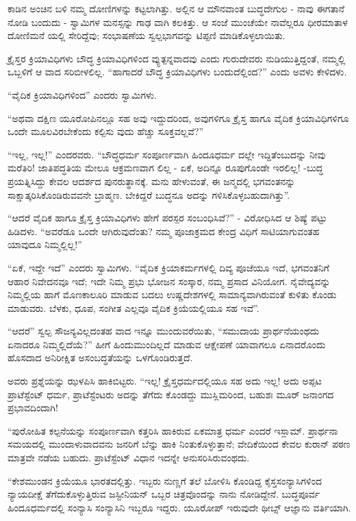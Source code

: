 ಕಾಡಿನ ಅಂಚಿನ ಬಳಿ ನಮ್ಮ ದೋಣಿಗಳನ್ನು ಕಟ್ಟಲಾಗಿತ್ತು. ಅಲ್ಲಿನ ಆ ಮೌನವಾಂತ ಬುದ್ಧದೇಗುಲ - ನಾವು ಈಗತಾನೆ ನೋಡಿ ಬಂದುದು - ಸ್ವಾಮಿಗಳ ಮನಸ್ಸನ್ನು ಗಾಢ ವಾಗಿ ಕಲಕಿತ್ತು. ಆ ಸಂಜೆ ಮುಂಚೆಯೇ ನಾವೆಲ್ಲರೂ ಧೀರಮಾತಾಳ ದೋಣಿಮನೆ ಯಲ್ಲಿ ಸೇರಿದ್ದೆವು; ಸಂಭಾಷಣೆಯ ಸ್ವಲ್ಪಭಾಗವನ್ನು ಟಿಪ್ಪಣಿ ಮಾಡಿಕೊಳ್ಳಲಾಯಿತು.

ಕ್ರೈಸ್ತರ ಕ್ರಿಯಾವಿಧಿಗಳು ಬೌದ್ಧ ಕ್ರಿಯಾವಿಧಿಗಳಿಂದ ವ್ಯುತ್ಪನ್ನವಾದವು ಎಂದು ಗುರುದೇವರು ನುಡಿಯುತ್ತಿದ್ದಂತೆ, ನಮ್ಮಲ್ಲಿ ಒಬ್ಬಳಿಗೆ ಆ ವಾದ ಸರಿಬೀಳಲಿಲ್ಲ. “ಹಾಗಾದರೆ ಬೌದ್ಧ ಕ್ರಿಯಾವಿಧಿಗಳು ಬಂದುದೆಲ್ಲಿಂದ?” ಎಂದು ಅವಳು ಕೇಳಿದಳು.

“ವೈದಿಕ ಕ್ರಿಯಾವಿಧಿಗಳಿಂದ” ಎಂದರು ಸ್ವಾಮಿಗಳು.

“ಅಥವಾ ದಕ್ಷಿಣ ಯೂರೋಪಿನಲ್ಲೂ ಸಹ ಅವು ಇದ್ದುದರಿಂದ, ಅವುಗಳಿಗೂ ಕ್ರೈಸ್ತ ಹಾಗೂ ವೈದಿಕ ಕ್ರಿಯಾವಿಧಿಗಳಿಗೂ ಒಂದೇ ಮೂಲವಿರಬೇಕೆಂದು ಕಲ್ಪಿಸು ವುದು ಹೆಚ್ಚು ಸೂಕ್ತವಲ್ಲವೆ?”

“ಇಲ್ಲ, ಇಲ್ಲ!” ಎಂದರವರು. “ಬೌದ್ಧಧರ್ಮ ಸಂಪೂರ್ಣವಾಗಿ ಹಿಂದೂಧರ್ಮ ದಲ್ಲೇ ಇದ್ದಿತೆಂಬುದನ್ನು ನೀವು ಮರೆತಿರಿ! ಜಾತಿಪದ್ಧತಿಯ ಮೇಲೂ ಆಕ್ರಮಣವಾಗ ಲಿಲ್ಲ - ಏಕೆ, ಅದಿನ್ನೂ ರೂಪುಗೊಂಡೇ ಇರಲಿಲ್ಲ! -ಬುದ್ಧ ಪ್ರಯತ್ನಿಸಿದ್ದು ಕೇವಲ ಆದರ್ಶದ ಪುನರುತ್ಥಾನಕ್ಕೆ. ಮನು ಹೇಳುವಂತೆ, ಈ ಜನ್ಮದಲ್ಲಿ ಭಗವಂತನನ್ನು ಸಾಕ್ಷಾತ್ಕರಿಸಿಕೊಂಡಿರುವವನೇ ಬ್ರಾಹ್ಮಣ. ಬೇಕಿದ್ದರೆ ಬುದ್ಧನೂ ಅದನ್ನು ಗಳಿಸಿಕೊಳ್ಳಬಹುದಾಗಿತ್ತು”.

“ಆದರೆ ವೈದಿಕ ಹಾಗೂ ಕ್ರೈಸ್ತ ಕ್ರಿಯಾವಿಧಿಗಳು ಹೇಗೆ ಪರಸ್ಪರ ಸಂಬಂಧಿಸಿವೆ?” - ವಿರೋಧಿಸಿದ ಆ ಶಿಷ್ಯೆ ಪಟ್ಟು ಹಿಡಿದಳು. “ಅವರೆಡೂ ಒಂದೇ ಆಗಿರುವುದೆಂತು? ನಮ್ಮ ಪೂಜಾಕ್ರಮದ ಕೇಂದ್ರ ವಿಧಿಗೆ ಸಾಟಿಯಾಗುವಂತಹ ಯಾವುದೂ ನಿಮ್ಮಲ್ಲಿಲ್ಲ!”

“ಏಕೆ, ಇದ್ದೇ ಇದೆ” ಎಂದರು ಸ್ವಾಮಿಗಳು. “ವೈದಿಕ ಕ್ರಿಯಾಕರ್ಮಗಳಲ್ಲಿ ದಿವ್ಯ ಪೂಜೆಯೂ ಇದೆ, ಭಗವಂತನಿಗೆ ಆಹಾರ ನಿವೇದನವೂ ಇದೆ; ಇದೇ ನಿಮ್ಮ ಪ್ರಭು ಭೋಜನ ಸಂಸ್ಕಾರ, ನಮ್ಮ ಪ್ರಸಾದ ವಿನಿಯೋಗ. ನೈವೇದ್ಯವನ್ನು ನಿಮ್ಮಲ್ಲಿಯ ಹಾಗೆ ಮೊಣಕಾಲೂರಿ ಮಾಡುವ ಬದಲು ಉಷ್ಣದೇಶಗಳಲ್ಲಿ ಸಾಮಾನ್ಯವಾಗಿರುವಂತೆ ಕುಳಿತು ಕೊಂಡು ಮಾಡುವರು. ಬೆಳಕು, ಧೂಪ, ಸಂಗೀತ ಎಲ್ಲವೂ ವೈದಿಕ ಕ್ರಿಯೆಯಲ್ಲಿಯೂ ಸಹ ಇವೆ”.

“ಆದರೆ” ಸ್ವಲ್ಪ ಸೌಜನ್ಯವಿಲ್ಲದಂತಹ ವಾದ ಇನ್ನೂ ಮುಂದುವರೆಯಿತು, “ಸಮುದಾಯ ಪ್ರಾರ್ಥನೆಯಂಥದು ಏನಾದರೂ ನಿಮ್ಮಲ್ಲಿದೆಯೆ?” ಹೀಗೆ ಹಿಂದುಮುಂದಿಲ್ಲದೆ ಮಾಡುವ ಆಕ್ಷೇಪಣೆ ಯಾವಾಗಲೂ ಏನಾದರೊಂದು ಹೊಸದಾದ ಅನಿರೀಕ್ಷಿತ ಅಸಂಬದ್ಧತೆಯನ್ನು ಒಳಗೊಂಡಿರುತ್ತದೆ.

ಅವರು ಪ್ರಶ್ನೆಯನ್ನು ಝಳಪಿಸಿ ಹಾಕಿಬಿಟ್ಟರು. “ಇಲ್ಲ! ಕ್ರೈಸ್ತಧರ್ಮದಲ್ಲಿಯೂ ಸಹ ಅದು ಇಲ್ಲ! ಅದು ಅಪ್ಪಟ ಪ್ರಾಟೆಸ್ಟೆಂಟ್ ಧರ್ಮ, ಪ್ರಾಟೆಸ್ಟೆಂಟರು ಅದನ್ನು ತೆಗೆದು ಕೊಂಡದ್ದು ಮುಸ್ಲಿಮರಿಂದ, ಬಹುಶಃ ಮೂರ್ ಜನಾಂಗದ ಪ್ರಭಾವದಿಂದಾಗಿ!

“ಪುರೋಹಿತ ಕಲ್ಪನೆಯನ್ನು ಸಂಪೂರ್ಣವಾಗಿ ಕತ್ತರಿಸಿ ಹಾಕಿರುವ ಏಕಮಾತ್ರ ಧರ್ಮ ಎಂದರೆ ಇಸ್ಲಾಮ್​. ಪ್ರಾರ್ಥನಾ ಸಮಯದಲ್ಲಿ ಮುಂದಾಳುವಾದವನು ಜನರಿಗೆ ಬೆನ್ನು ಹಾಕಿ ನಿಂತುಕೊಳ್ಳುತ್ತಾನೆ; ವೇದಿಕೆಯಿಂದ ಕೇವಲ ಕುರಾನ್ ಪಠಣ ಮಾತ್ರವೇ ನಡೆಯ ಬಹುದು. ಪ್ರಾಟೆಸ್ಟೆಂಟ್ ವಿಧಾನ ಇದನ್ನೇ ಅನುಸರಿಸಿರುವಂಥದು.

“ಕೇಶಮುಂಡನ ಕ್ರಿಯೆಯೂ ಭಾರತದಲ್ಲಿತ್ತು. ಇಬ್ಬರು ನುಣ್ಣಗೆ ತಲೆ ಬೋಳಿಸಿ ಕೊಂಡಿದ್ದ ಕೈಸ್ತಸಂನ್ಯಾಸಿಗಳಿಂದ ನ್ಯಾಯದೀಕ್ಷೆ ತೆಗೆದುಕೊಳ್ಳುತ್ತಿರುವ ಜಸ್ಟೀನಿಯನ್ ಒಬ್ಬರ ಚಿತ್ರವೊಂದನ್ನು ನಾನು ನೋಡಿದ್ದೇನೆ. ಬುದ್ಧಪೂರ್ವ ಹಿಂದೂಧರ್ಮದಲ್ಲಿ ಸಂನ್ಯಾಸಿ ಸಂನ್ಯಾಸಿನಿ ಇಬ್ಬರೂ ಇದ್ದರು. ಯೂರೋಪ್ ಇರುವುದೇ ಥೀಬ್ಸ್ ಆಜ್ಞಾನು ವರ್ತಿಯಾಗಿ.

